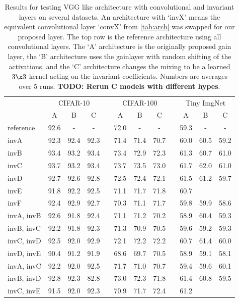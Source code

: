 \begin{table}
  \renewcommand{\arraystretch}{1.2}
  \centering
  \caption{Results for testing VGG like architecture with convolutional and
  invariant layers on several datasets. An architecture with `invX' means the
  equivalent convolutional layer `convX' from \autoref{tab:arch} was swapped for
  our proposed layer. The top row is the reference architecture using all
  convolutional layers. The `A' architecture is the originally proposed gain
  layer, the `B' architecture uses the gainlayer with random shifting of the
  activations, and the `C' architecture changes the mixing to be a learned
  $3\x3$ kernel acting on the invariant coefficients. Numbers are averages over
  5 runs. \textbf{TODO: Rerun C models with different hypes}.}
  \begin{tabular}{@{}lccclccclccc@{}}
    \toprule
    & \multicolumn{3}{c}{CIFAR-10} & \phantom{abc} & \multicolumn{3}{c}{CIFAR-100} & \phantom{abc} & \multicolumn{3}{c}{Tiny ImgNet} \\ \cline{2-4}\cline{6-8}\cline{10-12}
    \phantom{abc} & A  & B & C &&  A & B & C && A & B & C \\ \midrule
    reference & 92.6 & - & - && 72.0 & - & - && 59.3 & - & - \\ \midrule
    invA      & 92.3 & 92.4 & 92.3 && 71.4 & 71.4 & 70.7 && 60.0 & 60.5 & 59.2 \\
    invB      & 93.4 & 93.2 & 93.4 && 73.4 & 72.9 & 72.3 && 61.3 & 60.7 & 61.0 \\
    invC      & 93.7 & 93.2 & 93.4 && 73.7 & 73.5 & 73.0 && 61.7 & 62.0 & 61.0 \\
    invD      & 92.7 & 92.6 & 92.8 && 72.5 & 72.4 & 72.1 && 61.5 & 61.2 & 59.7 \\
    invE      & 91.8 & 92.2 & 92.5 && 71.1 & 71.7 & 71.8 && 60.7 & &  \\
    invF      & 92.4 & 92.9 & 92.7 && 70.3 & 71.1 & 71.7 && 59.8 & 59.9 & 58.6 \\
    invA, invB& 92.6 & 91.8 & 92.4 && 71.1 & 71.2 & 70.2 && 58.9 & 60.4 & 59.3 \\
    invB, invC& 92.2 & 91.8 & 92.3 && 71.3 & 70.9 & 70.5 && 59.6 & 59.2 & 59.3 \\
    invC, invD& 92.5 & 92.0 & 92.9 && 72.1 & 72.2 & 72.2 && 60.7 & 61.4 & 60.0 \\
    invD, invE& 90.4 & 91.2 & 91.9 && 68.6 & 69.7 & 70.5 && 58.9 & 59.1 & 58.1 \\
    invA, invC& 92.2 & 92.0 & 92.5 && 71.7 & 71.0 & 70.7 && 59.4 & 59.6 & 60.1 \\
    invB, invD& 92.8 & 92.3 & 82.8 && 73.0 & 72.3 & 71.8 && 61.4 & 60.8 & 59.5 \\
    invC, invE& 91.5 & 92.0 & 92.3 && 70.9 & 71.7 & 72.4 && 61.2 & & \\ \bottomrule
  \end{tabular}\label{tab:conv_results}
\end{table}

